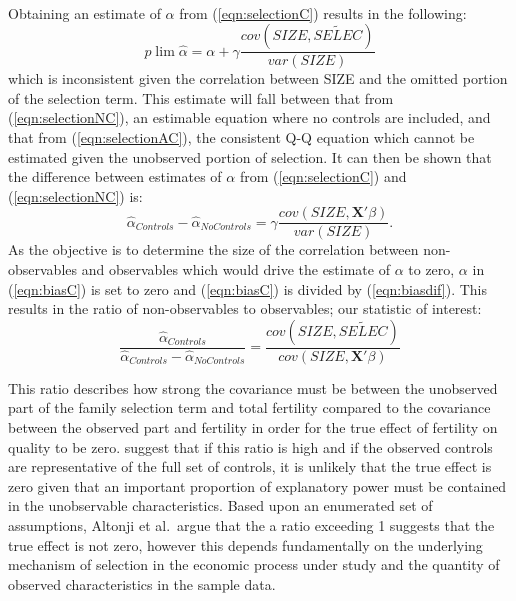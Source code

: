 \documentclass{article}[11pt,subeqn]
\newcommand{\vect}[1]{\mathbf{#1}}
\begin{document}
\begin{spacing}{1.25}
\begin{subequations}
\begin{eqnarray}
\end{eqnarray}
\end{subequations}
Obtaining an estimate of $\alpha$ from (\ref{eqn:selectionC}) results in the following:
\begin{equation}
\label{eqn:biasC}
 p\lim \hat\alpha=\alpha + \gamma\frac{cov(SIZE,\widetilde{SELEC})}{var(SIZE)}
\end{equation}
which is inconsistent given the correlation between SIZE and the omitted portion of the selection term.  This estimate will fall between that from (\ref{eqn:selectionNC}), an estimable equation where
no controls are included, and that from (\ref{eqn:selectionAC}), the consistent Q-Q equation which cannot be estimated given the unobserved portion of selection.  It can then be shown that the
difference between estimates of $\alpha$ from (\ref{eqn:selectionC}) and (\ref{eqn:selectionNC}) is:
\begin{equation}
 \label{eqn:biasdif}
\hat\alpha_{Controls} - \hat\alpha_{NoControls} = \gamma\frac{cov(SIZE,\vect{X}'\beta)}{var(SIZE)}.
\end{equation}
As the objective is to determine the size of the correlation between non-observables and observables which would drive the estimate of $\alpha$ to zero, $\alpha$ in (\ref{eqn:biasC})
is set to zero and (\ref{eqn:biasC}) is divided by (\ref{eqn:biasdif}).  This results in the ratio of non-observables to observables; our statistic of interest:
\begin{equation}
 \label{eqn:Aratio}
\frac{\hat\alpha_{Controls}}{\hat\alpha_{Controls} - \hat\alpha_{NoControls}}=\frac{cov(SIZE,\widetilde{SELEC})}{cov(SIZE,\vect{X}'\beta)}
\end{equation}

This ratio describes how strong the covariance must be between the unobserved part of the family selection term and total fertility compared to the covariance between the observed
part and fertility in order for the true effect of fertility on quality to be zero.  \citet{Altonjietal2005} suggest that if this ratio is high and if the observed controls are
representative of the full set of controls, it is unlikely that the true effect is zero given that an important proportion of explanatory power must be contained in the unobservable 
characteristics.  Based upon an enumerated set of assumptions, Altonji et al.\ argue that the a ratio exceeding 1 suggests that the true effect is not zero, however this depends 
fundamentally on the underlying mechanism of selection in the economic process under study and the quantity of observed characteristics in the sample data.


\end{spacing}
\end{document}
